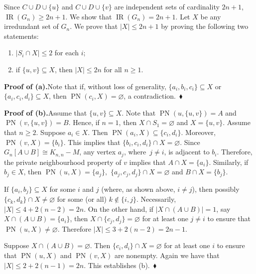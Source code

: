 \documentclass[12pt]{article}%
\begin{document}
Since $C\cup D\cup\{u\}$ and $C\cup D\cup\{v\}$ are independent sets of
cardinality $2n+1$, $\operatorname{IR}(G_{n})\geq2n+1$. We show that
$\operatorname{IR}(G_{n})=2n+1$. Let $X$ be any irredundant set of $G_{n}$. We
prove that $|X|\leq2n+1$ by proving the following two statements:

\begin{enumerate}
\item[(a)] $|S_{i}\cap X|\leq2$ for each $i$;

\item[(b)] if $\{u,v\}\subseteq X$, then $|X|\leq2n$ for all $n\geq1$.
\end{enumerate}

\noindent\textbf{Proof of (a).\hspace{0.1in}}Note that if, without loss of
generality, $\{a_{i},b_{i},c_{i}\}\subseteq X$ or $\{a_{i},c_{i}%
,d_{i}\}\subseteq X$, then $\operatorname{PN}(c_{i},X)=\varnothing$, a
contradiction.~$\blacklozenge$

\noindent\textbf{Proof of (b).\hspace{0.1in}}Assume that $\{u,v\}\subseteq X$.
Note that $\operatorname{PN}(u,\{u,v\})=A$ and $\operatorname{PN}%
(v,\{u,v\})=B$. Hence, if $n=1$, then $X\cap S_{1}=\varnothing$ and
$X=\{u,v\}$. Assume that $n\geq2$. Suppose $a_{i}\in X$. Then
$\operatorname{PN}(a_{i},X)\subseteq\{c_{i},d_{i}\}$. Moreover,
$\operatorname{PN}(v,X)=\{b_{i}\}$. This implies that $\{b_{i},c_{i}%
,d_{i}\}\cap X=\varnothing$. Since $G_{n}[A\cup B]\cong K_{n,n}-M$, any vertex
$a_{j}$, where\ $j\neq i$, is adjacent to $b_{i}$. Therefore, the private
neighbourhood property of $v$ implies that $A\cap X=\{a_{i}\}$. Similarly, if
$b_{j}\in X$, then $\operatorname{PN}(u,X)=\{a_{j}\},$ $\{a_{j},c_{j}%
,d_{j}\}\cap X=\varnothing$ and $B\cap X=\{b_{j}\}$.

If $\{a_{i},b_{j}\}\subseteq X$ for some $i$ and $j$ (where, as shown above,
$i\neq j$), then possibly $\{c_{k},d_{k}\}\cap X\neq\varnothing$ for some (or
all) $k\notin\{i,j\}$. Necessarily, $|X|\leq4+2(n-2)=2n$. On the other hand,
if $|X\cap(A\cup B)|=1$, say $X\cap(A\cup B)=\{a_{i}\}$, then $X\cap
\{c_{j},d_{j}\}=\varnothing$ for at least one $j\neq i$ to ensure that
$\operatorname{PN}(u,X)\neq\varnothing$. Therefore $|X|\leq3+2(n-2)=2n-1$.

Suppose $X\cap(A\cup B)=\varnothing$. Then $\{c_{i},d_{i}\}\cap X=\varnothing$
for at least one $i$ to ensure that $\operatorname{PN}(u,X)$ and
$\operatorname{PN}(v,X)$ are nonempty. Again we have that $|X|\leq
2+2(n-1)=2n$. This establishes (b).~$\blacklozenge$
\end{document}
